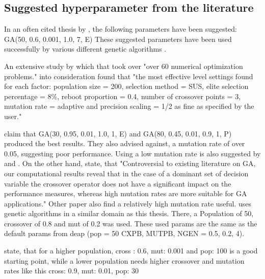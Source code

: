 \subsection{Suggested hyperparameter from the literature}
In an often cited thesis by \cite{de_jong_analysis_1975}, the following parameters have been suggested:
GA(50, 0.6, 0.001, 1.0, 7, E) These suggested parameters have been used successfully by various different genetic algorithms \cite{grefenstette_optimization_1986}. 

An extensive study by \cite{mills_determining_2015} which that took over "over 60 numerical optimization problems." into consideration found that "the most effective level settings found for each factor: population size = 200, selection method = SUS, elite selection percentage = 8\%, reboot proportion = 0.4, number of crossover points = 3, mutation rate = adaptive and precision scaling = 1/2 as fine as specified by the user."

\cite{grefenstette_optimization_1986} claim that GA(30, 0.95, 0.01, 1.0, 1, E) and GA(80, 0.45, 0.01, 0.9, 1, P) produced the best results. They also advised against, a mutation rate of over 0.05, suggesting poor performance. Using a low mutation rate is also suggested by \cite{whitley_genetic_1994} and \cite{jinghui_zhong_comparison_2005}. 
On the other hand, \cite{boyabatli_parameter_2004} state, that "Controversial to existing literature on GA, our computational results reveal that in the case of a dominant set of decision variable the crossover operator does not have a significant impact on the performance measures, whereas high mutation rates are more suitable for GA applications."
Other paper also find a relatively high mutation rate useful. \cite{almanee_scenorita_2021} uses genetic algorithms in a similar domain as this thesis. There, a Population of 50, crossover of 0.8 and mut of 0.2 was used. These used params are the same as the default params from deap (pop = 50 CXPB, MUTPB, NGEN = 0.5, 0.2, 4). 

\cite{srinivas_genetic_1994} state, that for a higher population, cross : 0.6, mut: 0.001 and pop: 100 is a good starting point, while a lower population needs higher crossover and mutation rates like this cross: 0.9, mut: 0.01, pop: 30


